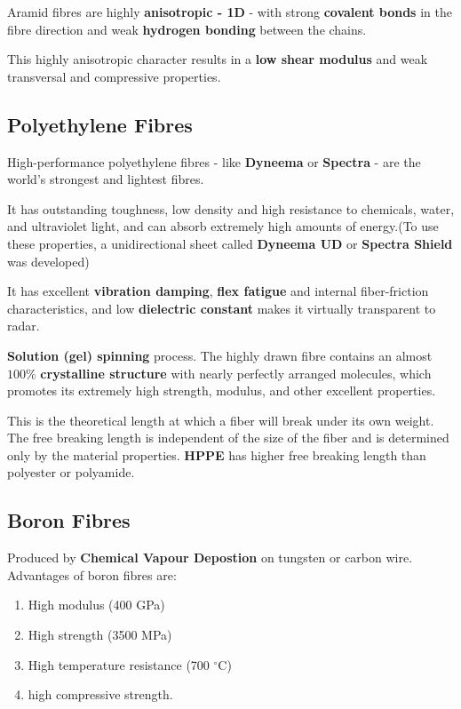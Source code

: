 \documentclass{NoteThesis/note-thesis}
\begin{document}
Aramid fibres are highly \textbf{anisotropic - 1D} - with strong \textbf{covalent bonds} in the fibre direction and weak \textbf{hydrogen bonding} between the chains. 

This highly anisotropic character results in a \textbf{low shear modulus} and weak transversal and compressive properties.

\subsection{Polyethylene Fibres}

High-performance polyethylene fibres - like \textbf{Dyneema} or \textbf{Spectra} - are the world's strongest and lightest fibres. 

It has outstanding toughness, low density and high resistance to chemicals, water, and ultraviolet light, and can absorb extremely high amounts of energy.(To use these properties, a unidirectional sheet called \textbf{Dyneema UD} or \textbf{Spectra Shield} was developed)

It has excellent \textbf{vibration damping}, \textbf{flex fatigue} and internal fiber-friction characteristics, and low \textbf{dielectric constant} makes it virtually transparent to radar.


\textbf{Solution (gel) spinning} process. The highly drawn fibre contains an almost $100\%$ \textbf{crystalline structure} with nearly perfectly arranged molecules, which promotes its extremely high strength, modulus, and other excellent properties.

\begin{mynote_env}[frametitle=Free breaking length]
    This is the theoretical length at which a fiber will break under its own weight.\\
    The free breaking length is independent of the size of the fiber and is determined only by the material properties. \textbf{HPPE} has higher free breaking length than polyester or polyamide.
\end{mynote_env}


\subsection{Boron Fibres}

Produced by \textbf{Chemical Vapour Depostion} on tungsten or carbon wire. Advantages of boron fibres are: 

\begin{enumerate}
    \item High modulus (400 GPa)
    \item High strength (3500 MPa)
    \item High temperature resistance (700 $^\circ \text{C}$)
    \item high compressive strength.
\end{enumerate}
\end{document}
